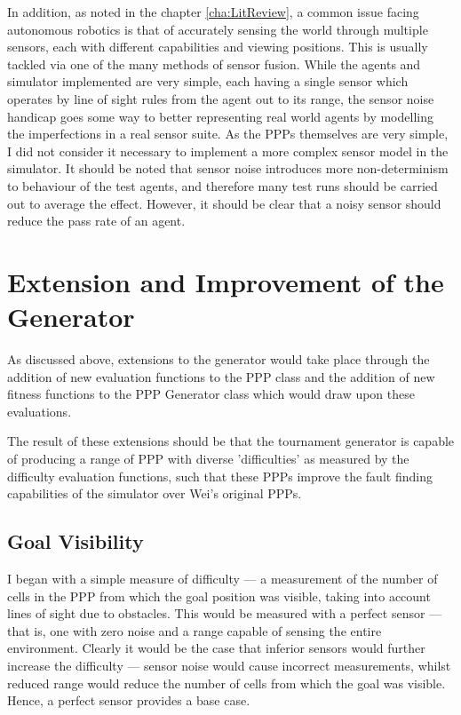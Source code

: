 \documentclass[authoryearcitations]{UoYCSproject}
\begin{document}
In addition, as noted in the chapter \ref{cha:LitReview}, a common issue facing autonomous robotics is that of accurately sensing the world through multiple sensors, each with different capabilities and viewing positions. This is usually tackled via one of the many methods of sensor fusion. While the agents and simulator implemented are very simple, each having a single sensor which operates by line of sight rules from the agent out to its range, the sensor noise handicap goes some way to better representing real world agents by modelling the imperfections in a real sensor suite. As the PPPs themselves are very simple, I did not consider it necessary to implement a more complex sensor model in the simulator. It should be noted that sensor noise introduces more non-determinism to behaviour of the test agents, and therefore many test runs should be carried out to average the effect. However, it should be clear that a noisy sensor should reduce the pass rate of an agent.

\section{Extension and Improvement of the Generator}
\label{sec:da_7}
As discussed above, extensions to the generator would take place through the addition of new evaluation functions to the PPP class and the addition of new fitness functions to the PPP Generator class which would draw upon these evaluations. 

The result of these extensions should be that the tournament generator is capable of producing a range of PPP with diverse 'difficulties' as measured by the difficulty evaluation functions, such that these PPPs improve the fault finding capabilities of the simulator over Wei's original PPPs.

\subsection{Goal Visibility}
\label{sec:goal_vis}
I began with a simple measure of difficulty --- a measurement of the number of cells in the PPP from which the goal position was visible, taking into account lines of sight due to obstacles. This would be measured with a perfect sensor --- that is, one with zero noise and a range capable of sensing the entire environment. Clearly it would be the case that inferior sensors would further increase the difficulty --- sensor noise would cause incorrect measurements, whilst reduced range would reduce the number of cells from which the goal was visible. Hence, a perfect sensor provides a base case.
\end{document}
